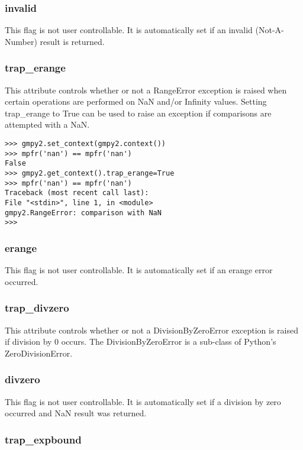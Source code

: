 \subsubsection{invalid}

This flag is not user controllable. It is automatically set if an invalid (Not-A-Number) result is
returned.

\subsubsection{trap\_erange}

This attribute controls whether or not a RangeError exception is raised when certain
operations are performed on NaN and/or Infinity values. Setting trap\_erange to True can be
used to raise an exception if comparisons are attempted with a NaN.

\begin{lstlisting}
>>> gmpy2.set_context(gmpy2.context())
>>> mpfr('nan') == mpfr('nan')
False
>>> gmpy2.get_context().trap_erange=True
>>> mpfr('nan') == mpfr('nan')
Traceback (most recent call last):
File "<stdin>", line 1, in <module>
gmpy2.RangeError: comparison with NaN
>>>
\end{lstlisting}

\subsubsection{erange}

This flag is not user controllable. It is automatically set if an erange error occurred.

\subsubsection{trap\_divzero}

This attribute controls whether or not a DivisionByZeroError exception is raised if division by
0 occurs. The DivisionByZeroError is a sub-class of Python's ZeroDivisionError.

\subsubsection{divzero}

This flag is not user controllable. It is automatically set if a division by zero occurred and NaN
result was returned.

\subsubsection{trap\_expbound}

